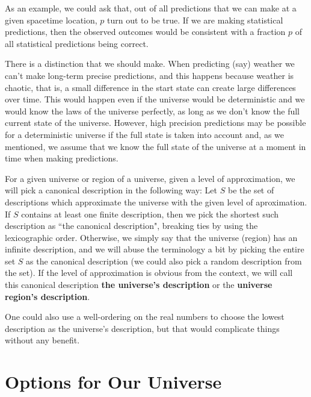 \documentclass[a4paper
,draft
]{article}
\newcommand{\definitie}[1]{\textbf{#1}}
\newcommand{\ghilimele}[1]{``#1"}
\begin{document}
As an example, we could ask that, out of all predictions that we can make
at a given spacetime location, $p$ turn out to be true. If we are making
statistical predictions, then the observed outcomes would be consistent
with a fraction $p$ of all statistical predictions being correct.

There is a distinction that we should make.
When predicting (say) weather we can't make long-term precise predictions,
and this happens because weather is chaotic, that is, a small difference
in the start state can create large differences over time.
This would happen even if the universe would be deterministic
and we would know the laws of the universe perfectly, as long as we don't know
the full current state of the universe.
However, high precision predictions may be possible for a deterministic
universe if the full state
is taken into account and, as we mentioned, we assume that we know the full
state of the universe at a moment in time when making predictions.

For a given universe or region of a universe,
given a level of approximation, we will pick a canonical description
in the following way: Let $S$ be the set of descriptions which approximate
the universe with the given level of aproximation. If $S$ contains
at least one finite description, then we pick the shortest such
description as \ghilimele{the canonical description}, breaking ties by
using the lexicographic order. Otherwise, we simply say that the
universe (region) has an infinite description, and we will abuse the
terminology a bit by picking the entire set
$S$ as the canonical description (we could
also pick a random description from the set).
If the level of approximation is obvious from the context, we will call
this canonical description \definitie{the universe's description}
or the \definitie{universe region's description}.

One could also use a well-ordering on the real numbers to choose the
lowest description as the universe's description, but that would
complicate things without any benefit.

\section{Options for Our Universe}
\label{sec:options}
\end{document}
